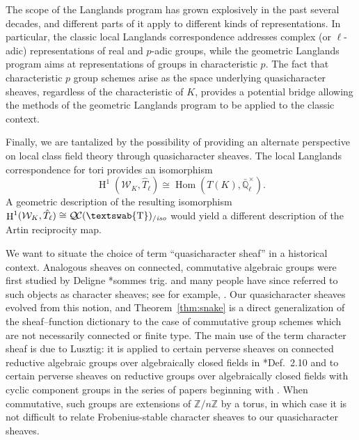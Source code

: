 \documentclass[11pt]{amsart}
\newcommand{\mathswab}[1]{\operatorname{\textswab{#1}}}
\theoremstyle{plain}
\theoremstyle{definition}
\theoremstyle{remark}
\newcommand{\ZZ}{{\mathbb{Z}}}
\newcommand{\EE}{\mathbb{\bar Q}_\ell}
\newcommand{\EEx}{\EE^\times}
\DeclareMathOperator{\Hom}{Hom}
\DeclareMathOperator{\Hh}{H}
\newcommand{\GN}[1]{\mathswab{#1}}
\newcommand{\QC}{{\mathcal{Q\hskip-0.8pt C}}}
\newcommand{\QCiso}[1]{\QC(#1)_{/\textit{iso}}}
\newcommand{\Weil}[1]{\mathcal{W}_{#1}}
\begin{document}
The scope of the Langlands program has grown explosively in the past several decades, and
different parts of it apply to different kinds of representations.  In particular, the classic local Langlands
correspondence addresses complex (or $\ell$-adic) representations of real and $p$-adic groups, while
the geometric Langlands program aims at representations of groups in characteristic $p$.  The fact that
characteristic $p$ group schemes arise as the space underlying quasicharacter sheaves, regardless of
the characteristic of $K$, provides a potential bridge allowing the methods of the geometric Langlands
program to be applied to the classic context.

Finally, we are tantalized by the possibility of providing an alternate perspective on local class field theory
through quasicharacter sheaves.  The local Langlands correspondence for tori provides an isomorphism
\[
\Hh^1(\Weil{K}, \hat{T}_\ell) \cong \Hom(T(K), \EEx).
\]
A geometric description of the resulting isomorphism $\Hh^1(\Weil{K}, \hat{T}_\ell) \cong \QCiso{\GN{T}}$
would yield a different description of the Artin reciprocity map.

We want to situate the choice of term ``quasicharacter sheaf'' in a historical context.
Analogous sheaves on connected, commutative algebraic groups were first studied
by Deligne \cite{deligne:SGA4.5}*{sommes trig.} and many people have since referred to such objects
as character sheaves; see for example, \cite{kamgarpour:09a}. 
Our quasicharacter sheaves evolved from this notion, and Theorem~\ref{thm:snake}
is a direct generalization of the sheaf--function dictionary to the case of commutative
group schemes which are not necessarily connected or finite type.  The main use
of the term character sheaf is due to Lusztig: it is applied to certain perverse sheaves on connected reductive algebraic groups over algebraically closed fields in \cite{lusztig:85a}*{Def.~2.10} and to certain perverse sheaves on reductive groups over algebraically closed fields with cyclic component groups in the series of papers beginning with \cite{lusztig:disconnected1}.  
When commutative, such groups are extensions of $\ZZ/n\ZZ$ by a torus,
in which case it is not difficult to relate Frobenius-stable character sheaves to our quasicharacter sheaves.
\end{document}
